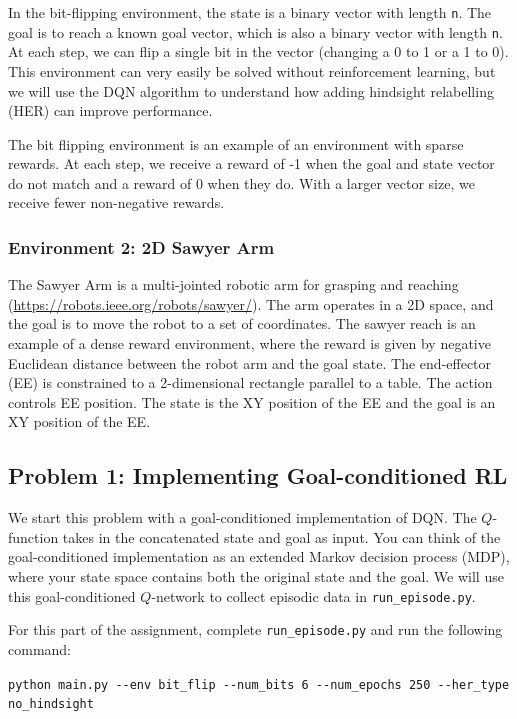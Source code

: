 \documentclass[12pt]{article}
\begin{document}
In the bit-flipping environment, the state is a binary vector with length \verb|n|. The goal is to reach a known goal vector, which is also a binary vector with length \verb|n|. At each step, we can flip a single bit in the vector (changing a 0 to 1 or a 1 to 0). This environment can very easily be solved without reinforcement learning, but we will use the DQN algorithm to understand how adding hindsight relabelling (HER) can improve performance.

The bit flipping environment is an example of an environment with sparse rewards. At each step, we receive a reward of -1 when the goal and state vector do not match and a reward of 0 when they do. With a larger vector size, we receive fewer non-negative rewards.

\subsubsection*{Environment 2: 2D Sawyer Arm}

The Sawyer Arm is a multi-jointed robotic arm for grasping and reaching (\url{https://robots.ieee.org/robots/sawyer/}). The arm operates in a 2D space, and the goal is to move the robot to a set of coordinates. The sawyer reach is an example of a dense reward environment, where the reward is given by negative Euclidean distance between the robot arm and the goal state. The end-effector (EE) is constrained to a 2-dimensional rectangle parallel to a table. The action controls EE position. The state is the XY position of the EE and the goal is an XY position of the EE.

\newpage

\subsection*{Problem 1: Implementing Goal-conditioned RL}
We start this problem with a goal-conditioned implementation of DQN. The $Q$-function takes in the concatenated state and goal as input. You can think of the goal-conditioned implementation as an extended Markov decision process (MDP), where your state space contains both the original state and the goal. We will use this goal-conditioned $Q$-network to collect episodic data in \texttt{run\_episode.py}.


For this part of the assignment, complete \texttt{run\_episode.py} and run the following command:

\verb|python main.py --env bit_flip --num_bits 6 --num_epochs 250 --her_type no_hindsight|
\end{document}
